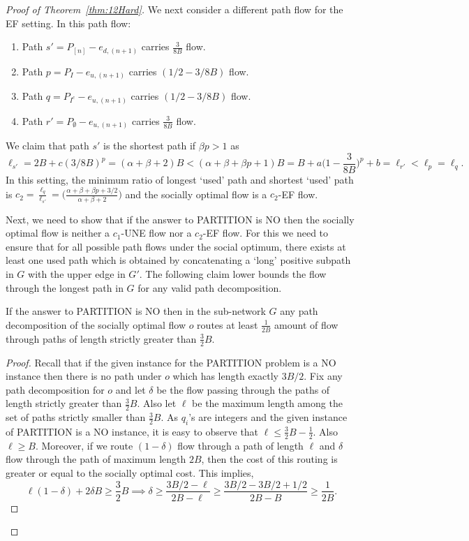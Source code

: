 \begin{proof}[Proof of Theorem~\ref{thm:12Hard}]
We next consider a different path flow for the EF setting. In this path flow:
\begin{enumerate}
	\item Path $s' = P_{[n]}-e_{d, (n+1)}$ carries $\frac{3}{8B}$ flow.
	\item Path $p = P_{I}-e_{u, (n+1)}$ carries $(1/2 - 3/8B)$ flow.
	\item Path $q = P_{I^c}-e_{u, (n+1)}$ carries $(1/2 - 3/8B)$ flow.
	\item Path $r'= P_{\emptyset}-e_{u, (n+1)}$ carries $\frac{3}{8B}$ flow.
\end{enumerate}
We claim that path $s'$ is the shortest path if $\beta p>1$ as
$$
\ell_{s'} = 2B + c(3/8B)^p = (\alpha+\beta+2)B <
(\alpha + \beta + \beta p + 1)B = B + a\bigg(1-\frac{3}{8B}\bigg)^p + b = \ell_{r'}<\ell_p=\ell_q.
$$
In this setting, the minimum ratio of longest `used' path and shortest `used' path is  $c_2 = \frac{\ell_{q}}{ \ell_{s'}}=\bigg(\frac{\alpha+\beta+\beta p+3/2}{\alpha+\beta+2}\bigg)$ and the socially optimal flow is a $c_2$-EF flow.

Next, we need to show that if the answer to PARTITION is NO then the socially optimal flow is neither a $c_1$-UNE flow nor a $c_2$-EF flow. For this we need to ensure that for all possible path flows under the social optimum, there exists at least one used path which is obtained by concatenating a `long' positive subpath in $G$ with the upper edge in $G'$. The following claim lower bounds the flow through the longest path in $G$ for any valid path decomposition. 

\begin{claim}\label{lemm:flowlower}
If the answer to PARTITION is NO then in the sub-network $G$ any path decomposition of the socially optimal flow $o$ routes at least $\frac{1}{2B}$ amount of flow through paths of length strictly greater than $\frac{3}{2}B$. 
\end{claim}
\begin{proof}
Recall that if the given instance for the PARTITION problem is a NO instance then there is no path under $o$ which has length exactly $3B/2$.
Fix any path decomposition for $o$ and let $\delta$ be the flow passing through the paths of length strictly greater than $\frac{3}{2}B$.   Also let $\ell$ be the maximum length among the set of paths strictly smaller than $\frac{3}{2}B$. As $q_i$'s are integers  and the given instance of PARTITION is a NO instance, it is easy to observe that $\ell \leq \frac{3}{2}B-\frac{1}{2}$. Also $\ell\geq B$. Moreover, if we route $(1-\delta)$ flow through a path of length $\ell$ and  $\delta$ flow through the path of maximum length $2B$, then the cost of this routing is greater or equal to the socially optimal cost. This implies,
$$\ell(1-\delta)+2\delta B \geq \frac{3}{2}B  \implies
\delta \geq \frac{3B/2-\ell}{2B-\ell} \geq \frac{3B/2-3B/2+1/2}{2B-B} \geq \frac{1}{2B}.$$
\end{proof}   


\end{proof}
